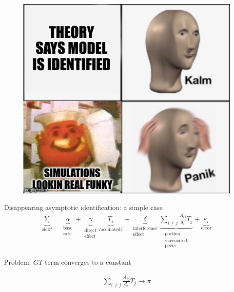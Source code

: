 \documentclass[aspectratio=169]{beamer}
\theoremstyle{remark}
\begin{document}
\begin{frame}
    \begin{figure}
        \centering
        \includegraphics[height=\textheight]{figures/kalm.jpg}
    \end{figure}
\end{frame}

\begin{frame}{Disappearing asymptotic identification: a simple case \citep{li2022c}}
    \begin{align*}
        \underbrace{Y_i}_\text{sick?} =
        \underbrace{\alpha}_{\substack{\text{base}                                    \\ \text{rate}}} +
        \underbrace{\gamma}_{\substack{\text{direct}                                  \\ \text{effect}}}
        \underbrace{T_i}_\text{vaccinated?} + 
        \underbrace{\delta}_{\substack{\text{interference}                            \\ \text{effect}}}
        \underbrace{\sum_{i \neq j} \frac{A_{ij}}{d_i} T_j}_{\substack{\text{portion} \\ \text{vaccinated} \\ \text{peers}}} +
        \underbrace{\varepsilon_i}_\text{error}
    \end{align*}
    
    Problem: $GT$ term converges to a constant
    
    \begin{align*}
        \sum_{i \neq j} \frac{A_{ij}}{d_i} T_j \to \pi                         
    \end{align*}
\end{frame}
\end{document}
